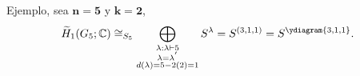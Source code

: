 \documentclass[final,xcolor=svgnames]{beamer}
\begin{document}
\begin{frame}{}
\begin{columns}
\begin{column}{0.5\textwidth}
       \begin{block}{Ejemplo, sea $\boldsymbol{n=5}$ y $\boldsymbol{k=2}$,}
         \begin{equation*}
           \widetilde H_{1}(G_{5};\mathbb{C})\cong_{S_{5}}\bigoplus_{\substack{\lambda:\lambda\vdash 5\\
               \lambda=\lambda^{'}\\d(\lambda)=5-2(2)=1}} S^{\lambda}=S^{(3,1,1)}=S^{\ydiagram{3,1,1}}.
         \end{equation*}
       \end{block}
      

\end{column}
\end{columns}
\end{frame}
\end{document}
